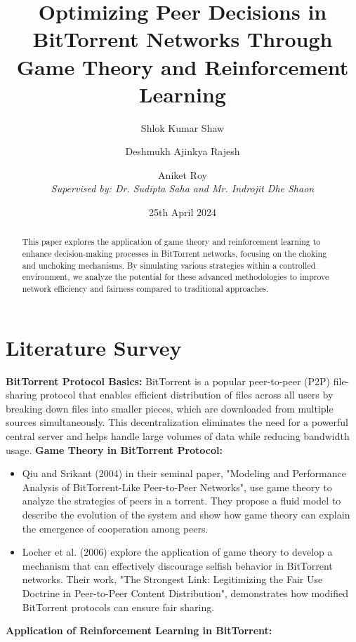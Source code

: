 \documentclass{article}
\title{Optimizing Peer Decisions in BitTorrent Networks Through Game Theory and Reinforcement Learning}
\author{Shlok Kumar Shaw \and Deshmukh Ajinkya Rajesh \and Aniket Roy \\ \textit{Supervised by: Dr. Sudipta Saha and Mr. Indrojit Dhe Shaon}}
\date{25th April 2024}
\begin{document}
\maketitle

\begin{abstract}
This paper explores the application of game theory and reinforcement learning to enhance decision-making processes in BitTorrent networks, focusing on the choking and unchoking mechanisms. By simulating various strategies within a controlled environment, we analyze the potential for these advanced methodologies to improve network efficiency and fairness compared to traditional approaches.
\end{abstract}

\section{Literature Survey}
\textbf{BitTorrent Protocol Basics:}
BitTorrent is a popular peer-to-peer (P2P) file-sharing protocol that enables efficient distribution of files across all users by breaking down files into smaller pieces, which are downloaded from multiple sources simultaneously. This decentralization eliminates the need for a powerful central server and helps handle large volumes of data while reducing bandwidth usage.
\newline
\newline
\textbf{Game Theory in BitTorrent Protocol:}
\begin {itemize} 
\item Qiu and Srikant (2004) in their seminal paper, "Modeling and Performance Analysis of BitTorrent-Like Peer-to-Peer Networks", use game theory to analyze the strategies of peers in a torrent. They propose a fluid model to describe the evolution of the system and show how game theory can explain the emergence of cooperation among peers.

\item Locher et al. (2006) explore the application of game theory to develop a mechanism that can effectively discourage selfish behavior in BitTorrent networks. Their work, "The Strongest Link: Legitimizing the Fair Use Doctrine in Peer-to-Peer Content Distribution", demonstrates how modified BitTorrent protocols can ensure fair sharing.

\end {itemize}
\textbf{Application of Reinforcement Learning in BitTorrent:}
\end{document}
